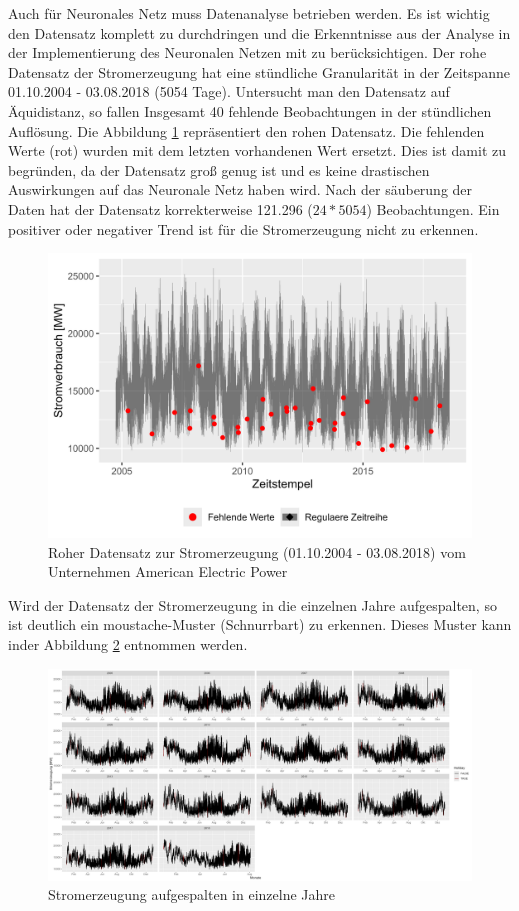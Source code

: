 \documentclass[11pt,ngerman,a4paper,]{article}
\begin{document}
Auch für Neuronales Netz muss Datenanalyse betrieben werden. Es ist wichtig den Datensatz komplett zu durchdringen und die Erkenntnisse aus der Analyse in der Implementierung des Neuronalen Netzen mit zu berücksichtigen. Der rohe Datensatz der Stromerzeugung hat eine stündliche Granularität in der Zeitspanne 01.10.2004 - 03.08.2018 (5054 Tage). Untersucht man den Datensatz auf Äquidistanz, so fallen Insgesamt 40 fehlende Beobachtungen in der stündlichen Auflösung. Die Abbildung \ref{fig:raw_AEP} repräsentiert den rohen Datensatz. Die fehlenden Werte (rot) wurden mit dem letzten vorhandenen Wert ersetzt. Dies ist damit zu begründen, da der Datensatz groß genug ist und es keine drastischen Auswirkungen auf das Neuronale Netz haben wird. Nach der säuberung der Daten hat der Datensatz korrekterweise 121.296 (\(24*5054\)) Beobachtungen. Ein positiver oder negativer Trend ist für die Stromerzeugung nicht zu erkennen.

\begin{figure}[H]
\centering
\includegraphics[width=1.0\textwidth]{plots/raw_AEP_MW.png}
\caption{Roher Datensatz zur Stromerzeugung (01.10.2004 - 03.08.2018) vom Unternehmen American Electric Power}
\label{fig:raw_AEP}
\end{figure}

Wird der Datensatz der Stromerzeugung in die einzelnen Jahre aufgespalten, so ist deutlich ein moustache-Muster (Schnurrbart) zu erkennen. Dieses Muster kann inder Abbildung \ref{fig:raw_years} entnommen werden.

\begin{figure}[H]
\centering
\includegraphics[width=1.0\textwidth]{plots/raw_years.png}
\caption{Stromerzeugung aufgespalten in einzelne Jahre}
\label{fig:raw_years}
\end{figure}
\end{document}

